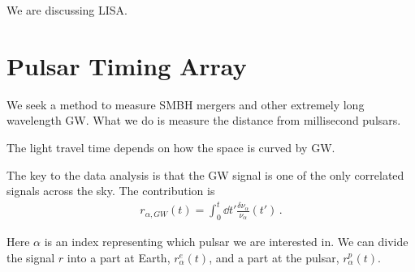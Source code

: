 \documentclass[main.tex]{subfiles}
\begin{document}

We are discussing LISA. 

\section{Pulsar Timing Array}

We seek a method to measure SMBH mergers and other extremely long wavelength GW. 
What we do is measure the distance from millisecond pulsars. 

The light travel time depends on how the space is curved by GW. 

The key to the data analysis is that the GW signal is one of the only correlated signals across the sky. The contribution is 
%
\begin{align}
r_{\alpha , GW} (t) = \int_{0}^{t} \dd{t'} \frac{ \delta \nu _\alpha }{\nu _\alpha } (t')
\,.
\end{align}

Here \(\alpha \) is an index representing which pulsar we are interested in. 
We can divide the signal \(r\) into a part at Earth,  \(r^{e}_{\alpha }(t)\), and a part at the pulsar, \(r^{p}_{\alpha }(t)\). 

\end{document}
